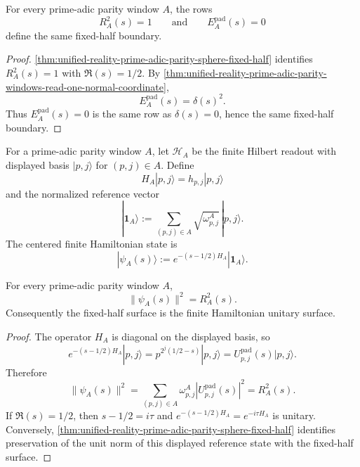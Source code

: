 \begin{corollary}
\label{cor:unified-reality-sphere-radius-normal-energy-same-boundary}
For every prime-adic parity window $A$, the rows
$$
R_A^2(s)=1
\qquad\text{and}\qquad
E_A^{\mathrm{pad}}(s)=0
$$
define the same fixed-half boundary.
\end{corollary}

\begin{proof}
\autoref{thm:unified-reality-prime-adic-parity-sphere-fixed-half}
identifies $R_A^2(s)=1$ with $\Re(s)=1/2$.  By
\autoref{thm:unified-reality-prime-adic-parity-windows-read-one-normal-coordinate},
$$
E_A^{\mathrm{pad}}(s)=\delta(s)^2.
$$
Thus $E_A^{\mathrm{pad}}(s)=0$ is the same row as $\delta(s)=0$, hence
the same fixed-half boundary.
\end{proof}

\begin{definition}
\label{def:unified-reality-finite-hamiltonian-sphere-state}
For a prime-adic parity window $A$, let $\mathcal H_A$ be the finite
Hilbert readout with displayed basis $|p,j\rangle$ for $(p,j)\in A$.
Define
$$
H_A|p,j\rangle=h_{p,j}|p,j\rangle
$$
and the normalized reference vector
$$
|\mathbf 1_A\rangle
:=
\sum_{(p,j)\in A}
\sqrt{\omega_{p,j}^{A}}\,|p,j\rangle.
$$
The centered finite Hamiltonian state is
$$
|\psi_A(s)\rangle
:=
e^{-(s-1/2)H_A}|\mathbf 1_A\rangle.
$$
\end{definition}

\begin{theorem}
\label{thm:unified-reality-finite-hamiltonian-norm-sphere-radius}
For every prime-adic parity window $A$,
$$
\|\psi_A(s)\|^2=R_A^2(s).
$$
Consequently the fixed-half surface is the finite Hamiltonian unitary
surface.
\end{theorem}

\begin{proof}
The operator $H_A$ is diagonal on the displayed basis, so
$$
e^{-(s-1/2)H_A}|p,j\rangle
=
p^{2^j(1/2-s)}|p,j\rangle
=
U_{p,j}^{\mathrm{pad}}(s)|p,j\rangle.
$$
Therefore
$$
\|\psi_A(s)\|^2
=
\sum_{(p,j)\in A}
\omega_{p,j}^{A}
\left|U_{p,j}^{\mathrm{pad}}(s)\right|^2
=
R_A^2(s).
$$
If $\Re(s)=1/2$, then $s-1/2=i\tau$ and
$e^{-(s-1/2)H_A}=e^{-i\tau H_A}$ is unitary.  Conversely,
\autoref{thm:unified-reality-prime-adic-parity-sphere-fixed-half}
identifies preservation of the unit norm of this displayed reference
state with the fixed-half surface.
\end{proof}

